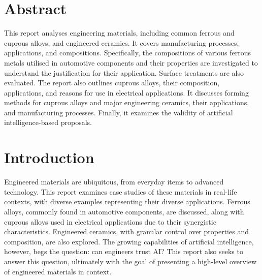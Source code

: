 \documentclass[../main.tex]{subfiles}
\begin{document}
\section{Abstract} %
This report analyses engineering materials, including common ferrous and cuprous alloys, and engineered ceramics.
It covers manufacturing processes, applications, and compositions.
Specifically, the compositions of various ferrous metals utilised in automotive components and their properties are investigated to understand the justification for their application.
Surface treatments are also evaluated.
The report also outlines cuprous alloys, their composition, applications, and reasons for use in electrical applications.
It discusses forming methods for cuprous alloys and major engineering ceramics, their applications, and manufacturing processes.
Finally, it examines the validity of artificial intelligence-based proposals.
\newpage

\tableofcontents
\newpage

\section{Introduction} %
Engineered materials are ubiquitous, from everyday items to advanced technology.
This report examines case studies of these materials in real-life contexts, with diverse examples representing their diverse applications.
Ferrous alloys, commonly found in automotive components, are discussed, along with cuprous alloys used in electrical applications due to their synergistic characteristics.
Engineered ceramics, with granular control over properties and composition, are also explored.
The growing capabilities of artificial intelligence, however, begs the question: can engineers trust AI?
This report also seeks to answer this question, ultimately with the goal of presenting a high-level overview of engineered materials in context.
\end{document}
